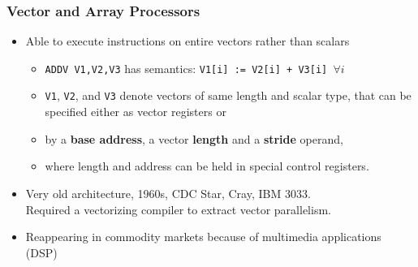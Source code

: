 \documentclass{beamer}
\newcommand{\emp}[1]{\textcolor{DikuRed}{ #1}}
\begin{document}
\begin{frame}[fragile,t]
\frametitle{Vector and Array Processors}

\begin{itemize}
    \item Able to execute instructions on entire vectors rather than scalars\medskip
    \begin{itemize}
        \item {\tt ADDV V1,V2,V3} has semantics: 
                {\tt V1[i] := V2[i] + V3[i] $\forall i$}\smallskip
        \item {\tt V1}, {\tt V2}, and  {\tt V3} denote vectors of same 
                length and scalar type, that can be specified either 
                as vector registers or\smallskip
        \item by a \emp{\bf base address}, a vector \emp{\bf length} 
                and a \emp{\bf stride} operand,\smallskip
        \item where length and address can be held in special control registers.
    \end{itemize}\medskip

    \item Very old architecture, 1960s, CDC Star, Cray, IBM 3033.\\
            Required a vectorizing compiler to extract vector parallelism.\medskip 

    \item \alert{Reappearing in commodity markets because of 
                    multimedia applications (DSP)} 
\end  {itemize}


\end{frame}
\end{document}
